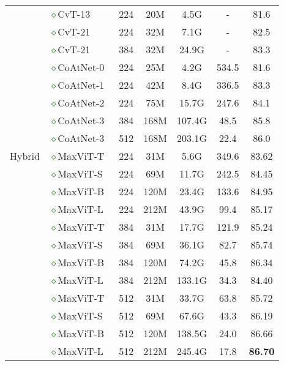 \documentclass[runningheads]{llncs}
\begin{document}
\begin{table}[!t]
\begin{tabular}{c|l|ccccc}
\multirow{17}{*}{Hybrid} &
\textcolor{darkgreen}{$\diamond$}CvT-13~\cite{wu2021cvt} & 224 & 20M & 4.5G & - & 81.6 \\
& \textcolor{darkgreen}{$\diamond$}CvT-21~\cite{wu2021cvt} & 224 & 32M & 7.1G & - & 82.5 \\
& \textcolor{darkgreen}{$\diamond$}CvT-21~\cite{wu2021cvt} & 384 & 32M & 24.9G & - & 83.3 \\
& \textcolor{darkgreen}{$\diamond$}CoAtNet-0~\cite{dai2021coatnet} & 224 & 25M & 4.2G & 534.5 & 81.6 \\
& \textcolor{darkgreen}{$\diamond$}CoAtNet-1~\cite{dai2021coatnet} & 224 & 42M & 8.4G & 336.5 & 83.3 \\
& \textcolor{darkgreen}{$\diamond$}CoAtNet-2~\cite{dai2021coatnet} & 224 & 75M & 15.7G & 247.6 &  84.1 \\
& \textcolor{darkgreen}{$\diamond$}CoAtNet-3~\cite{dai2021coatnet} & 384 & 168M & 107.4G & 48.5 & 85.8 \\
& \textcolor{darkgreen}{$\diamond$}CoAtNet-3~\cite{dai2021coatnet} & 512 & 168M & 203.1G & 22.4 & 86.0 \\
\cmidrule(lr){2-7}
& \textcolor{darkgreen}{$\diamond$}MaxViT-T  & 224 & 31M & 5.6G & 349.6 & 83.62 \\
& \textcolor{darkgreen}{$\diamond$}MaxViT-S  & 224 & 69M & 11.7G & 242.5 & 84.45 \\
& \textcolor{darkgreen}{$\diamond$}MaxViT-B & 224 & 120M & 23.4G & 133.6 & 84.95 \\
& \textcolor{darkgreen}{$\diamond$}MaxViT-L  & 224 &  212M & 43.9G & 99.4 & 85.17 \\
\cmidrule(lr){2-7}
& \textcolor{darkgreen}{$\diamond$}MaxViT-T  & 384 & 31M & 17.7G & 121.9 & 85.24 \\
& \textcolor{darkgreen}{$\diamond$}MaxViT-S & 384 & 69M & 36.1G & 82.7 & 85.74 \\
& \textcolor{darkgreen}{$\diamond$}MaxViT-B & 384 & 120M & 74.2G & 45.8 & 86.34 \\
& \textcolor{darkgreen}{$\diamond$}MaxViT-L & 384 &  212M & 133.1G & 34.3 & 84.40 \\
\cmidrule(lr){2-7}
& \textcolor{darkgreen}{$\diamond$}MaxViT-T & 512 & 31M & 33.7G &  63.8 & 85.72 \\
& \textcolor{darkgreen}{$\diamond$}MaxViT-S & 512 & 69M & 67.6G & 43.3 & 86.19 \\
& \textcolor{darkgreen}{$\diamond$}MaxViT-B & 512 & 120M & 138.5G & 24.0 & 86.66 \\
& \textcolor{darkgreen}{$\diamond$}MaxViT-L & 512 &  212M & 245.4G & 17.8 & \textbf{86.70} \\
\bottomrule
\end{tabular}
\end{table}
\end{document}
